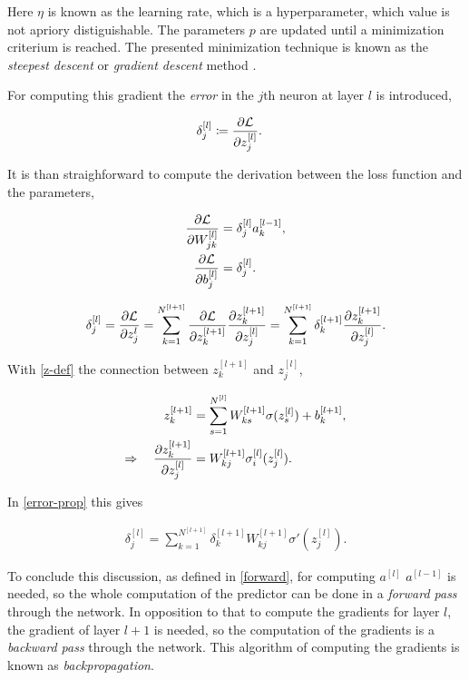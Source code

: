 \documentclass[12pt, a4paper]{thesis}
\begin{document}
Here \(\eta\) is known as the learning rate, which is a hyperparameter, which
value is not apriory distiguishable. The parameters \(p\) are updated until a
minimization criterium is reached. The presented minimization technique is known
as the \emph{steepest descent} or \emph{gradient descent} method \cite{cauchy}.

For computing this gradient  the \emph{error} in the \(j\text{th}\) neuron at layer \(l\) is introduced,

\begin{align}
\delta^{[l]}_{j}  &\coloneqq \pdv{\mathcal{L}}{z^{[l]}_{j}}.
\end{align}

It is than straighforward to compute the derivation between the loss function and the parameters,

\begin{align}
 \pdv{\mathcal{L}}{W^{[l]}_{jk}} &= \delta^{[l]}_{j} a_{k}^{[l-1]}, \\
 \pdv{\mathcal{L}}{b^{[l]}_{j}} &= \delta^{[l]}_{j}.
\end{align}

\begin{align}  \label{error-prop}
\delta^{[l]}_{j}  = \pdv{\mathcal{L}}{z^{l}_{j}} = \sum^{N^{[l+1]}}_{k=1} \pdv{\mathcal{L}}{z_{k}^{[l+1]}}\pdv{{z_{k}^{[l+1]}}}{z_{j}^{[l]}} = \sum^{N^{[l+1]}}_{k=1} \delta^{[l+1]}_{k} \pdv{{z_{k}^{[l+1]}}}{z_{j}^{[l]}}.
\end{align}

With \eqref{z-def} the connection between \(z_{k}^{[l+1]}\) and \(z_{j}^{[l]}\),

\begin{align}
z^{[l+1]}_{k} &= \sum_{s=1}^{N^{[l]}} W^{[l+1]}_{ks} \sigma(z^{[l]}_{s}) + b^{[l+1]}_{k}, \\
\Rightarrow \quad \pdv{z_{k}^{[l+1]}}{z_{j}^{[l]}} &= W^{[l+1]}_{kj} \sigma^{[l]}_{i}(z^{[l]}_{j}).
\end{align}

In \eqref{error-prop} this gives

\begin{align}
\delta^{[l]}_{j} = \sum^{N^{[l+1]}}_{k=1} \delta^{[l+1]}_{k} W^{[l+1]}_{kj} \sigma'(z^{[l]}_{j}).
\end{align}

To conclude this discussion, as defined in \eqref{forward}, for computing
\(a^{[l]}\) \(a^{[l-1]}\) is needed, so the whole computation of the predictor can
be done in a \emph{forward pass} through the network. In opposition to that to
compute the gradients for layer \(l\), the gradient of layer \(l+1\) is needed, so
the computation of the gradients is a \emph{backward pass} through the network.
This algorithm of computing the gradients is known as \emph{backpropagation}.
\end{document}
